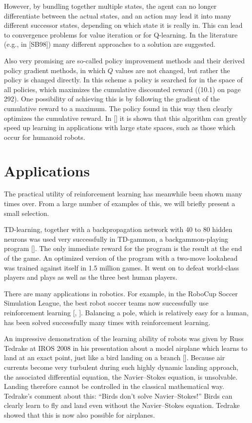 \documentclass[10pt]{book}
\begin{document}
However, by bundling together multiple states, the agent can no longer differentiate between the actual states, and an action may lead it into many different successor states, depending on which state it is really in. This can lead to convergence problems for value iteration or for Q-learning. In the literature (e.g., in [SB98]) many different approaches to a solution are suggested.

Also very promising are so-called policy improvement methods and their derived policy gradient methods, in which $Q$ values are not changed, but rather the policy is changed directly. In this scheme a policy is searched for in the space of all policies, which maximizes the cumulative discounted reward ((10.1) on page 292). One possibility of achieving this is by following the gradient of the cumulative reward to a maximum. The policy found in this way then clearly optimizes the cumulative reward. In [\cite{peters2008policygradients}] it is shown that this algorithm can greatly speed up learning in applications with large state spaces, such as those which occur for humanoid robots.

\section{Applications}
The practical utility of reinforcement learning has meanwhile been shown many times over. From a large number of examples of this, we will briefly present a small selection.

TD-learning, together with a backpropagation network with 40 to 80 hidden neurons was used very successfully in TD-gammon, a backgammon-playing program [\cite{tesauro1995tdgammon}]. The only immediate reward for the program is the result at the end of the game. An optimized version of the program with a two-move lookahead was trained against itself in 1.5 million games. It went on to defeat world-class players and plays as well as the three best human players.

There are many applications in robotics. For example, in the RoboCup Soccer Simulation League, the best robot soccer teams now successfully use reinforcement learning [\cite{stone2005keepaway}, \cite{robocupsimulator}]. Balancing a pole, which is relatively easy for a human, has been solved successfully many times with reinforcement learning.

An impressive demonstration of the learning ability of robots was given by Russ Tedrake at IROS 2008 in his presentation about a model airplane which learns to land at an exact point, just like a bird landing on a branch [\cite{tedrake2008reynolds}]. Because air currents become very turbulent during such highly dynamic landing approach, the associated differential equation, the Navier--Stokes equation, is unsolvable. Landing therefore cannot be controlled in the classical mathematical way. Tedrake's comment about this: ``Birds don't solve Navier--Stokes!'' Birds can clearly learn to fly and land even without the Navier--Stokes equation. Tedrake showed that this is now also possible for airplanes.
\end{document}
